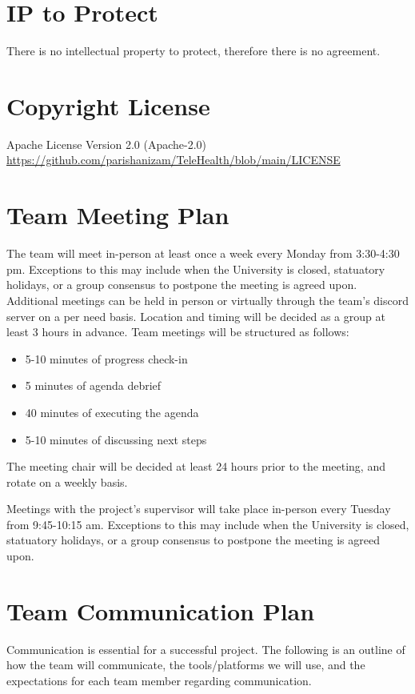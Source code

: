 \documentclass{article}
\begin{document}
\section{IP to Protect}

There is no intellectual property to protect, therefore there is no agreement.

\section{Copyright License}

Apache License Version 2.0 (Apache-2.0) \\
\url{https://github.com/parishanizam/TeleHealth/blob/main/LICENSE}

\section{Team Meeting Plan}

The team will meet in-person at least once a week every Monday from 3:30-4:30 pm. Exceptions to this 
may include when the University is closed, statuatory holidays, or a group consensus to postpone the meeting
is agreed upon. Additional meetings can be held in person or virtually through the team's discord server on 
a per need basis. Location and timing will be decided as a group at least 3 hours in advance. Team meetings will
be structured as follows:
\begin{itemize}
  \item 5-10 minutes of progress check-in 
  \item 5 minutes of agenda debrief
  \item 40 minutes of executing the agenda
  \item 5-10 minutes of discussing next steps
\end{itemize}
\indent The meeting chair will be decided at least 24 hours prior to the meeting, and rotate on a weekly basis.

Meetings with the project's supervisor will take place in-person every Tuesday from 9:45-10:15 am. Exceptions 
to this may include when the University is closed, statuatory holidays, or a group consensus to postpone the 
meeting is agreed upon.

\section{Team Communication Plan}

Communication is essential for a successful project. The following is an outline of how the team will 
communicate, the tools/platforms we will use, and the expectations for each team member regarding communication.\\
\end{document}
